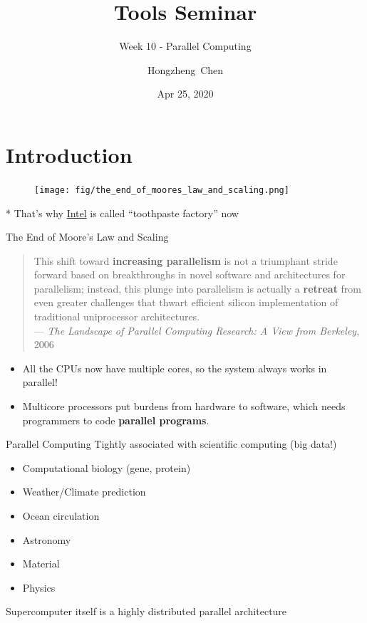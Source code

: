\documentclass{../TexTemplate/myslide}
\title[ToolsSeminar]{Tools Seminar}
\subtitle{Week 10 - Parallel Computing}
\author[chhzh123]{Hongzheng~Chen}
\date[Apr 25, 2020]{Apr 25, 2020}
\begin{document}

\begin{frame}
\titlepage
\end{frame}

\begin{frame}
\tableofcontents
\end{frame}

\section{Introduction}
\begin{frame}
\sectionpage
\end{frame}

\begin{frame}
\begin{figure}
\centering
\texttt{[image: fig/the\_end\_of\_moores\_law\_and\_scaling.png]}
\end{figure}
* That's why \href{https://en.wikipedia.org/wiki/Tick\%E2\%80\%93tock_model}{Intel} is called ``toothpaste factory'' now
\end{frame}

\begin{frame}{The End of Moore's Law and Scaling}
\begin{quote}
This shift toward \textbf{increasing parallelism} is not a triumphant stride forward based on breakthroughs in novel software and architectures for parallelism;
instead, this plunge into parallelism is actually a \textbf{retreat} from even greater challenges that thwart efficient silicon implementation of traditional uniprocessor architectures.\\
\hfill ---  \emph{The Landscape of Parallel Computing Research: A View from Berkeley}, 2006
\end{quote}
\pause
\begin{itemize}
\item All the CPUs now have multiple cores, so the system always works in parallel!
\item Multicore processors put burdens from hardware to software, which needs programmers to code \textbf{parallel programs}.
\end{itemize}
\end{frame}

\begin{frame}{Parallel Computing}
Tightly associated with scientific computing (big data!)
\begin{itemize}
	\item Computational biology (gene, protein)
	\item Weather/Climate prediction
	\item Ocean circulation
	\item Astronomy
	\item Material
	\item Physics
\end{itemize}
Supercomputer itself is a highly distributed parallel architecture
\end{frame}
\end{document}
